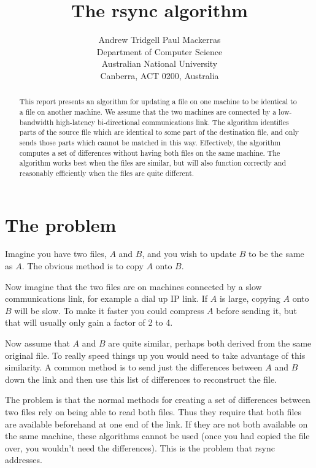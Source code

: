 \documentclass[a4paper]{article}
\begin{document}
\title{The rsync algorithm}

\author{Andrew Tridgell \quad\quad Paul Mackerras\\
Department of Computer Science \\
Australian National University \\
Canberra, ACT 0200, Australia}

\maketitle

\begin{abstract}
  This report presents an algorithm for updating a file on one machine
  to be identical to a file on another machine.  We assume that the
  two machines are connected by a low-bandwidth high-latency
  bi-directional communications link.  The algorithm identifies parts
  of the source file which are identical to some part of the
  destination file, and only sends those parts which cannot be matched
  in this way.  Effectively, the algorithm computes a set of
  differences without having both files on the same machine.  The
  algorithm works best when the files are similar, but will also
  function correctly and reasonably efficiently when the files are
  quite different.
\end{abstract}

\section{The problem}

Imagine you have two files, $A$ and $B$, and you wish to update $B$ to be
the same as $A$. The obvious method is to copy $A$ onto $B$.

Now imagine that the two files are on machines connected by a slow
communications link, for example a dial up IP link.  If $A$ is large,
copying $A$ onto $B$ will be slow.  To make it faster you could
compress $A$ before sending it, but that will usually only gain a
factor of 2 to 4.

Now assume that $A$ and $B$ are quite similar, perhaps both derived
from the same original file. To really speed things up you would need
to take advantage of this similarity. A common method is to send just
the differences between $A$ and $B$ down the link and then use this
list of differences to reconstruct the file.

The problem is that the normal methods for creating a set of
differences between two files rely on being able to read both files.
Thus they require that both files are available beforehand at one end
of the link.  If they are not both available on the same machine,
these algorithms cannot be used (once you had copied the file over,
you wouldn't need the differences).  This is the problem that rsync
addresses.
\end{document}
